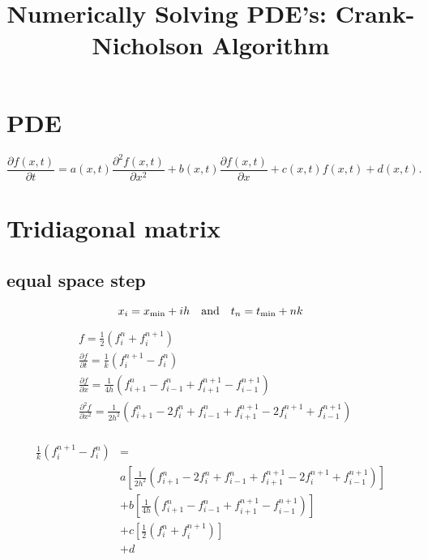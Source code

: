 \documentclass{article}
\begin{document}
\title{Numerically Solving PDE's: Crank-Nicholson Algorithm}
\maketitle

\section{PDE}
    \begin{equation}
        \frac{\partial f(x,t)}{\partial t} = 
        a(x,t) \frac{\partial^2 f(x,t)}{\partial x^2}
        + b(x,t) \frac{\partial f(x,t)}{\partial x}
        + c(x,t) f(x,t)
        + d(x,t).
    \end{equation}

\section{Tridiagonal matrix}
\subsection{equal space step}
    \begin{equation}
        x_i = x_{\min} + ih \quad  {\rm and} \quad t_n = t_{\min} + nk
    \end{equation}

    \begin{equation}
        \begin{split}
            & f = \frac{1}{2} \left( f_i^n + f_i^{n+1} \right) \\
            & \frac{\partial f}{\partial t} = \frac{1}{k}
            \left(f_i^{n+1} - f_i^n\right) \\
            & \frac{\partial f}{\partial x} = \frac{1}{4h}
                \left( f_{i+1}^n - f_{i-1}^n + f_{i+1}^{n+1} - f_{i-1}^{n+1} \right) \\
            & \frac{\partial^2 f}{\partial x^2} = \frac{1}{2h^2}
                \left( f_{i+1}^n - 2f_i^{n} + f_{i-1}^n
                     + f_{i+1}^{n+1} - 2f_i^{n+1} +f_{i-1}^{n+1} \right) \\
        \end{split}
    \end{equation}

    \begin{equation}
        \begin{split}
            \frac{1}{k}\left(f_i^{n+1} - f_i^n\right) &= \\
            & a \left[
                \frac{1}{2h^2} \left( f_{i+1}^n - 2f_i^{n} + f_{i-1}^n
                     + f_{i+1}^{n+1} - 2f_i^{n+1} +f_{i-1}^{n+1} \right)
                     \right] \\
            & + b \left[ 
            \frac{1}{4h}
                \left( f_{i+1}^n - f_{i-1}^n + f_{i+1}^{n+1} - f_{i-1}^{n+1} \right)
                     \right] \\
            & + c \left[ 
                \frac{1}{2} \left( f_i^n + f_i^{n+1} \right)
                     \right] \\
            & + d
        \end{split}
    \end{equation}
\end{document}
